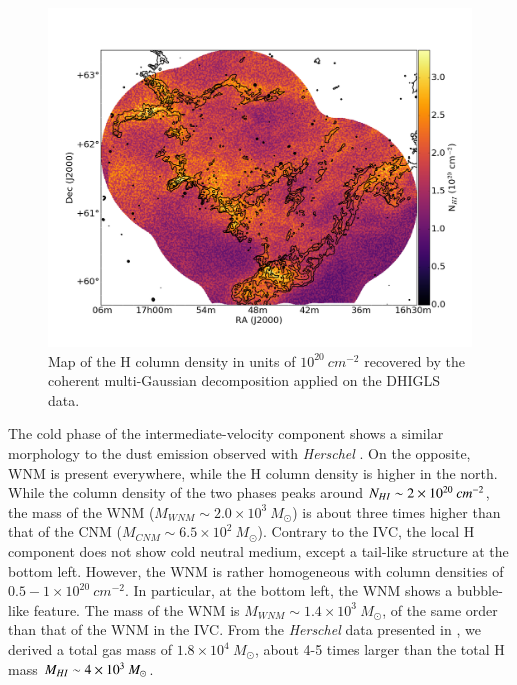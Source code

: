 \documentclass[traditabstract]{aa}
\begin{document}
\begin{figure}[h!]
  \centering
  \includegraphics[width=0.8\linewidth,trim=45 55 65 105,clip=true]{Figures/DHIGLS_NHI_tot.png}
  \caption{\label{NHI_DHIGLS} Map of the H column density in units of $10^{20}\: cm^{-2}$ recovered by the coherent multi-Gaussian decomposition applied on the DHIGLS data.}
\end{figure}

   The cold phase of the intermediate-velocity component shows a similar morphology to the dust emission observed with \emph{Herschel} \citep{MAMD_2017b}. On the opposite, WNM is present everywhere, while the H column density is higher in the north. While the column density of the two phases peaks around $N_{H\rmnum{1}}\sim 2\times 10^{20}\: cm^{-2}$, the mass of the WNM ($M_{WNM}\sim 2.0\times 10^3\: M_\odot$) is about three times higher than that of the CNM ($M_{CNM}\sim 6.5\times 10^2\: M_\odot$).
Contrary to the IVC, the local H component does not show cold neutral medium, except a tail-like structure at the bottom left. However, the WNM is rather homogeneous with column densities of $0.5-1\times 10^{20}\: cm^{-2}$. In particular, at the bottom left, the WNM shows a bubble-like feature. The mass of the WNM is $M_{WNM}\sim 1.4\times 10^3\: M_\odot$, of the same order than that of the WNM in the IVC.
From the \emph{Herschel} data presented in \cite{MAMD_2017b}, we derived a total gas mass of $1.8\times 10^4\: M_\odot$, about 4-5 times larger than the total H mass $M_{H\rmnum{1}}\sim 4\times 10^3\: M_\odot$.
\end{document}
